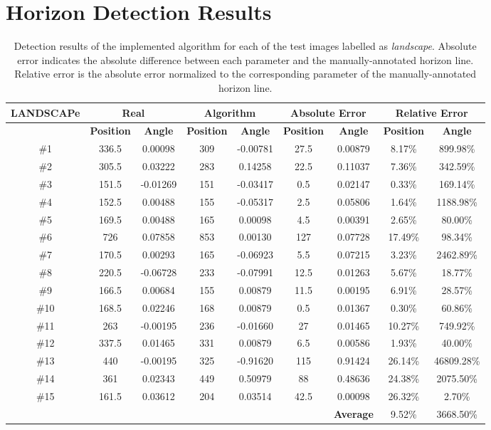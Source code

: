 \chapter{Horizon Detection Results}
\label{app:horizon_results}
\begin{table}[htbp]
	\footnotesize
\begin{center}
\begin{tabular}{ c c c c c c c c c }
\hline
\textbf{LANDSCAPe} & \multicolumn{ 2}{c}{\textbf{Real}} & \multicolumn{ 2}{c}{\textbf{Algorithm}} & \multicolumn{ 2}{c}{\textbf{Absolute Error}} & \multicolumn{ 2}{c}{\textbf{Relative Error}} \\ \hline
\multicolumn{1}{l}{} & \textbf{Position} & \textbf{Angle} & \textbf{Position} & \textbf{Angle} & \textbf{Position} & \textbf{Angle} & \textbf{Position} & \textbf{Angle} \\ \hline
\#1 & 336.5 & 0.00098 & 309 & -0.00781 & 27.5 & 0.00879 & 8.17\% & 899.98\% \\
\#2 & 305.5 & 0.03222 & 283 & 0.14258 & 22.5 & 0.11037 & 7.36\% & 342.59\% \\ 
\#3 & 151.5 & -0.01269 & 151 & -0.03417 & 0.5 & 0.02147 & 0.33\% & 169.14\% \\
\#4 & 152.5 & 0.00488 & 155 & -0.05317 & 2.5 & 0.05806 & 1.64\% & 1188.98\% \\
\#5 & 169.5 & 0.00488 & 165 & 0.00098 & 4.5 & 0.00391 & 2.65\% & 80.00\% \\ 
\#6 & 726 & 0.07858 & 853 & 0.00130 & 127 & 0.07728 & 17.49\% & 98.34\% \\ 
\#7 & 170.5 & 0.00293 & 165 & -0.06923 & 5.5 & 0.07215 & 3.23\% & 2462.89\% \\ 
\#8 & 220.5 & -0.06728 & 233 & -0.07991 & 12.5 & 0.01263 & 5.67\% & 18.77\% \\ 
\#9 & 166.5 & 0.00684 & 155 & 0.00879 & 11.5 & 0.00195 & 6.91\% & 28.57\% \\ 
\#10 & 168.5 & 0.02246 & 168 & 0.00879 & 0.5 & 0.01367 & 0.30\% & 60.86\% \\ 
\#11 & 263 & -0.00195 & 236 & -0.01660 & 27 & 0.01465 & 10.27\% & 749.92\% \\ 
\#12 & 337.5 & 0.01465 & 331 & 0.00879 & 6.5 & 0.00586 & 1.93\% & 40.00\% \\ 
\#13 & 440 & -0.00195 & 325 & -0.91620 & 115 & 0.91424 & 26.14\% & 46809.28\% \\ 
\#14 & 361 & 0.02343 & 449 & 0.50979 & 88 & 0.48636 & 24.38\% & 2075.50\% \\ 
\#15 & 161.5 & 0.03612 & 204 & 0.03514 & 42.5 & 0.00098 & 26.32\% & 2.70\% \\ \hline
& & & & & & \textbf{Average} & 9.52\% & 3668.50\% \\ \hline
\end{tabular}
\end{center}
\caption{Detection results of the implemented algorithm for each of the test images labelled as \emph{landscape}. Absolute error indicates the absolute difference between each parameter and the manually-annotated horizon line. Relative error is the absolute error normalized to the corresponding parameter of the manually-annotated horizon line.}
\label{tab:land_tab}
\end{table}

